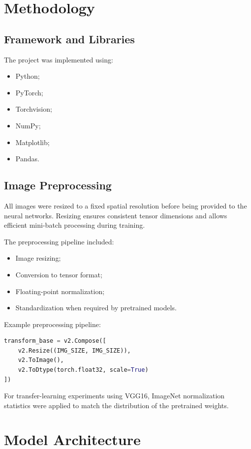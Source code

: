 \documentclass[conference,a4paper]{IEEEtran}
\begin{document}
\section{Methodology}

\subsection{Framework and Libraries}

The project was implemented using:
\begin{itemize}
    \item Python;
    \item PyTorch;
    \item Torchvision;
    \item NumPy;
    \item Matplotlib;
    \item Pandas.
\end{itemize}

\subsection{Image Preprocessing}

All images were resized to a fixed spatial resolution before being provided to the neural networks. Resizing ensures consistent tensor dimensions and allows efficient mini-batch processing during training.

The preprocessing pipeline included:
\begin{itemize}
    \item Image resizing;
    \item Conversion to tensor format;
    \item Floating-point normalization;
    \item Standardization when required by pretrained models.
\end{itemize}

Example preprocessing pipeline:

\begin{lstlisting}[language=Python]
transform_base = v2.Compose([
    v2.Resize((IMG_SIZE, IMG_SIZE)),
    v2.ToImage(),
    v2.ToDtype(torch.float32, scale=True)
])
\end{lstlisting}

For transfer-learning experiments using VGG16, ImageNet normalization statistics were applied to match the distribution of the pretrained weights.

\section{Model Architecture}
\end{document}
